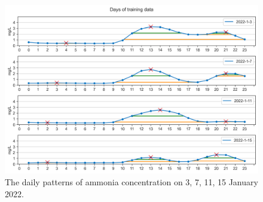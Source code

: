 \begin{figure}[!ht]
  \centering
  \includegraphics[width=0.8\columnwidth]{imgs/results/nh3-pattern.png}
  \caption{The daily patterns of ammonia concentration on 3, 7, 11, 15 January 2022.}
  \label{fig:nh3-peak-pattern}
\end{figure}

